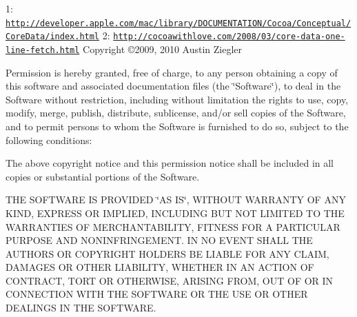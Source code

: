 1\-: \href{http://developer.apple.com/mac/library/DOCUMENTATION/Cocoa/Conceptual/CoreData/index.html}{\tt http\-://developer.\-apple.\-com/mac/library/\-D\-O\-C\-U\-M\-E\-N\-T\-A\-T\-I\-O\-N/\-Cocoa/\-Conceptual/\-Core\-Data/index.\-html} 2\-: \href{http://cocoawithlove.com/2008/03/core-data-one-line-fetch.html}{\tt http\-://cocoawithlove.\-com/2008/03/core-\/data-\/one-\/line-\/fetch.\-html} Copyright \copyright 2009, 2010 Austin Ziegler

Permission is hereby granted, free of charge, to any person obtaining a copy of this software and associated documentation files (the \char`\"{}\-Software\char`\"{}), to deal in the Software without restriction, including without limitation the rights to use, copy, modify, merge, publish, distribute, sublicense, and/or sell copies of the Software, and to permit persons to whom the Software is furnished to do so, subject to the following conditions\-:

The above copyright notice and this permission notice shall be included in all copies or substantial portions of the Software.

T\-H\-E S\-O\-F\-T\-W\-A\-R\-E I\-S P\-R\-O\-V\-I\-D\-E\-D \char`\"{}\-A\-S I\-S\char`\"{}, W\-I\-T\-H\-O\-U\-T W\-A\-R\-R\-A\-N\-T\-Y O\-F A\-N\-Y K\-I\-N\-D, E\-X\-P\-R\-E\-S\-S O\-R I\-M\-P\-L\-I\-E\-D, I\-N\-C\-L\-U\-D\-I\-N\-G B\-U\-T N\-O\-T L\-I\-M\-I\-T\-E\-D T\-O T\-H\-E W\-A\-R\-R\-A\-N\-T\-I\-E\-S O\-F M\-E\-R\-C\-H\-A\-N\-T\-A\-B\-I\-L\-I\-T\-Y, F\-I\-T\-N\-E\-S\-S F\-O\-R A P\-A\-R\-T\-I\-C\-U\-L\-A\-R P\-U\-R\-P\-O\-S\-E A\-N\-D N\-O\-N\-I\-N\-F\-R\-I\-N\-G\-E\-M\-E\-N\-T. I\-N N\-O E\-V\-E\-N\-T S\-H\-A\-L\-L T\-H\-E A\-U\-T\-H\-O\-R\-S O\-R C\-O\-P\-Y\-R\-I\-G\-H\-T H\-O\-L\-D\-E\-R\-S B\-E L\-I\-A\-B\-L\-E F\-O\-R A\-N\-Y C\-L\-A\-I\-M, D\-A\-M\-A\-G\-E\-S O\-R O\-T\-H\-E\-R L\-I\-A\-B\-I\-L\-I\-T\-Y, W\-H\-E\-T\-H\-E\-R I\-N A\-N A\-C\-T\-I\-O\-N O\-F C\-O\-N\-T\-R\-A\-C\-T, T\-O\-R\-T O\-R O\-T\-H\-E\-R\-W\-I\-S\-E, A\-R\-I\-S\-I\-N\-G F\-R\-O\-M, O\-U\-T O\-F O\-R I\-N C\-O\-N\-N\-E\-C\-T\-I\-O\-N W\-I\-T\-H T\-H\-E S\-O\-F\-T\-W\-A\-R\-E O\-R T\-H\-E U\-S\-E O\-R O\-T\-H\-E\-R D\-E\-A\-L\-I\-N\-G\-S I\-N T\-H\-E S\-O\-F\-T\-W\-A\-R\-E. 

